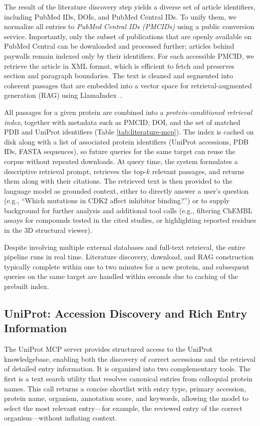 \documentclass{article}
\begin{document}
The result of the literature discovery step yields a diverse set of article identifiers, including PubMed IDs, DOIs, and PubMed Central IDs. To unify them, we normalize all entries to \emph{PubMed Central IDs (PMCIDs)} using a public conversion service. Importantly, only the subset of publications that are openly available on PubMed Central can be downloaded and processed further; articles behind paywalls remain indexed only by their identifiers. For each accessible PMCID, we retrieve the article in XML format, which is efficient to fetch and preserves section and paragraph boundaries. The text is cleaned and segmented into coherent passages that are embedded into a vector space for retrieval-augmented generation (RAG) using LlamaIndex~\citep{Liu_LlamaIndex_2022}.

All passages for a given protein are combined into a \emph{protein-conditioned retrieval index}, together with metadata such as PMCID, DOI, and the set of matched PDB and UniProt identifiers (Table \ref{tab:literature-mcp}). The index is cached on disk along with a list of associated protein identifiers (UniProt accessions, PDB IDs, FASTA sequences), so future queries for the same target can reuse the corpus without repeated downloads. At query time, the system formulates a descriptive retrieval prompt, retrieves the top-$k$ relevant passages, and returns them along with their citations. The retrieved text is then provided to the language model as grounded context, either to directly answer a user’s question (e.g., “Which mutations in CDK2 affect inhibitor binding?”) or to supply background for further analysis and additional tool calls (e.g., filtering ChEMBL assays for compounds tested in the cited studies, or highlighting reported residues in the 3D structural viewer).

Despite involving multiple external databases and full-text retrieval, the entire pipeline runs in real time. Literature discovery, download, and RAG construction typically complete within one to two minutes for a new protein, and subsequent queries on the same target are handled within seconds due to caching of the prebuilt index.




\subsection{UniProt: Accession Discovery and Rich Entry Information}\label{sec\:data\:uniprot}
The UniProt MCP server provides structured access to the UniProt knowledgebase, enabling both the discovery of correct accessions and the retrieval of detailed entry information. It is organized into two complementary tools. The first is a text search utility that resolves canonical entries from colloquial protein names. This call returns a concise shortlist with entry type, primary accession, protein name, organism, annotation score, and keywords, allowing the model to select the most relevant entry—for example, the reviewed entry of the correct organism—without inflating context.
\end{document}
